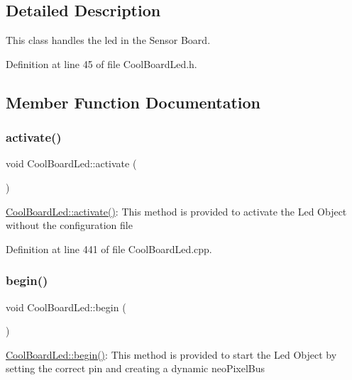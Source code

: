 \subsection{Detailed Description}
This class handles the led in the Sensor Board. 

Definition at line 45 of file Cool\+Board\+Led.\+h.



\subsection{Member Function Documentation}
\mbox{\label{class_cool_board_led_ae74fe4b47d06c3a97b468ba220c4eb99}} 
\subsubsection{\texorpdfstring{activate()}{activate()}}
{\footnotesize\ttfamily void Cool\+Board\+Led\+::activate (\begin{DoxyParamCaption}{ }\end{DoxyParamCaption})}

\hyperlink{class_cool_board_led_ae74fe4b47d06c3a97b468ba220c4eb99}{Cool\+Board\+Led\+::activate()}\+: This method is provided to activate the Led Object without the configuration file 

Definition at line 441 of file Cool\+Board\+Led.\+cpp.

\mbox{\label{class_cool_board_led_ae3cbde8affcc6f011cbd698c8ef911f6}} 
\subsubsection{\texorpdfstring{begin()}{begin()}}
{\footnotesize\ttfamily void Cool\+Board\+Led\+::begin (\begin{DoxyParamCaption}{ }\end{DoxyParamCaption})}

\hyperlink{class_cool_board_led_ae3cbde8affcc6f011cbd698c8ef911f6}{Cool\+Board\+Led\+::begin()}\+: This method is provided to start the Led Object by setting the correct pin and creating a dynamic neo\+Pixel\+Bus 

